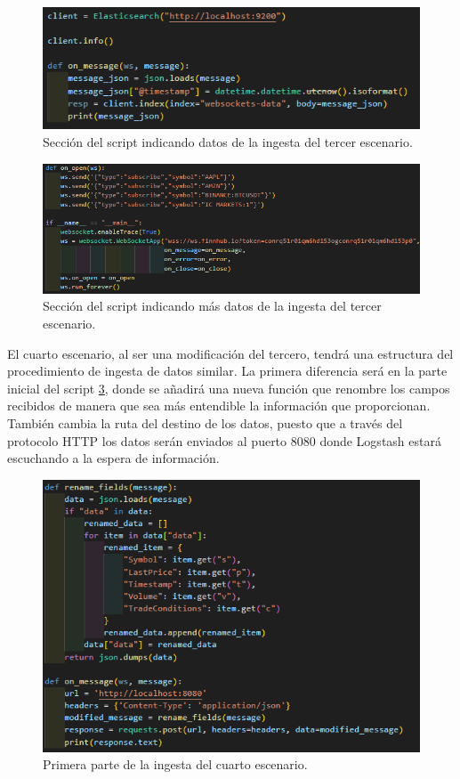 \begin{figure}
    \centering
    \includegraphics[width=1\linewidth]{img/ingesta31.png}
    \caption{Sección del script indicando datos de la ingesta del tercer escenario.}
    \label{fig:ingesta31}
\end{figure}
\begin{figure}
    \centering
    \includegraphics[width=1\linewidth]{img/ingesta32.png}
    \caption{Sección del script indicando más datos de la ingesta del tercer escenario.}
    \label{fig:ingesta32}
\end{figure}

El cuarto escenario, al ser una modificación del tercero, tendrá una estructura del procedimiento de ingesta de datos similar. La primera diferencia será en la parte inicial del script \ref{fig:ingesta41}, donde se añadirá una nueva función que renombre los campos recibidos de manera que sea más entendible la información que proporcionan. También cambia la ruta del destino de los datos, puesto que a través del protocolo HTTP los datos serán enviados al puerto 8080 donde Logstash estará escuchando a la espera de información.

\begin{figure}
    \centering
    \includegraphics[width=1\linewidth]{img/ingesta41.png}
    \caption{Primera parte de la ingesta del cuarto escenario.}
    \label{fig:ingesta41}
\end{figure}

